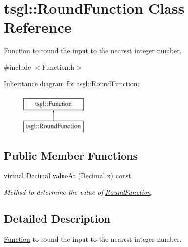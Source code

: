 \hypertarget{classtsgl_1_1_round_function}{\section{tsgl\-:\-:Round\-Function Class Reference}
\label{classtsgl_1_1_round_function}
}


\hyperlink{classtsgl_1_1_function}{Function} to round the input to the nearest integer number.  




{\ttfamily \#include $<$Function.\-h$>$}

Inheritance diagram for tsgl\-:\-:Round\-Function\-:\begin{figure}[H]
\begin{center}
\leavevmode
\includegraphics[height=2.000000cm]{classtsgl_1_1_round_function}
\end{center}
\end{figure}
\subsection*{Public Member Functions}
\begin{DoxyCompactItemize}
\item 
virtual Decimal \hyperlink{classtsgl_1_1_round_function_a3047ee723fae828d9379d946012028ca}{value\-At} (Decimal x) const 
\begin{DoxyCompactList}\small\item\em Method to determine the value of \hyperlink{classtsgl_1_1_round_function}{Round\-Function}. \end{DoxyCompactList}\end{DoxyCompactItemize}


\subsection{Detailed Description}
\hyperlink{classtsgl_1_1_function}{Function} to round the input to the nearest integer number. 

